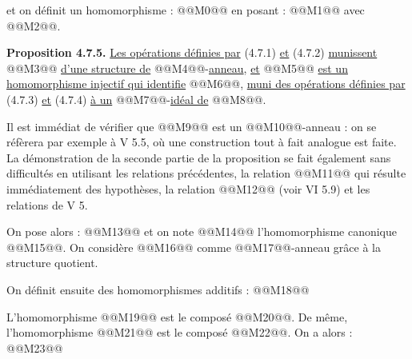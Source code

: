 
et on
définit un homomorphisme :
@@M0@@
en posant :
@@M1@@
avec @@M2@@.

\textbf{Proposition 4.7.5.} \uline{Les opérations définies par} (4.7.1) \uline{et} (4.7.2) \uline{munissent} @@M3@@ \uline{d'une structure de} @@M4@@-\uline{anneau}, \uline{et} @@M5@@ \uline{est un homomorphisme injectif qui identifie} @@M6@@, \uline{muni des opérations définies par} (4.7.3) \uline{et} (4.7.4) \uline{à un} @@M7@@-\uline{idéal de} @@M8@@.

Il est immédiat de vérifier que @@M9@@ est un @@M10@@-anneau : on se réfèrera par exemple à V 5.5, où une construction tout à fait analogue est faite. La démonstration de la seconde partie de la proposition se fait également sans difficultés en utilisant les relations précédentes, la relation @@M11@@ qui résulte immédiatement des hypothèses, la relation @@M12@@ (voir VI 5.9) et les relations de V 5.

On pose alors :
@@M13@@
et on note @@M14@@ l'homomorphisme canonique @@M15@@. On considère @@M16@@ comme @@M17@@-anneau grâce à la structure quotient.

On définit ensuite des homomorphismes additifs :
@@M18@@

L'homomorphisme @@M19@@ est le composé @@M20@@. De même, l'homomorphisme @@M21@@ est le composé @@M22@@. On a alors :
@@M23@@

